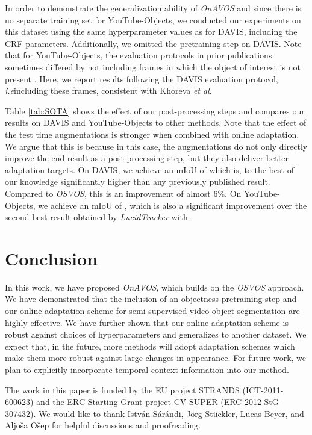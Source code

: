 \documentclass{bmvc2k}
\newcommand{\methodname}[1]{\mbox{\emph{#1}}}
\def\etal{\emph{et al}\bmvaOneDot}
\def\ie{\emph{i.e}\bmvaOneDot}
\newcommand{\PARbegin}[1]{\noindent {\bf #1~}}
\begin{document}
In order to demonstrate the generalization ability of \methodname{OnAVOS} and since there is no separate training set for YouTube-Objects, we conducted our experiments on this dataset using the same hyperparameter values as for DAVIS, including the CRF parameters. Additionally, we omitted the pretraining step on DAVIS. Note that for YouTube-Objects, the evaluation protocols in prior publications sometimes differed by not including frames in which the object of interest is not present \cite{lucidtracker}. Here, we report results following the DAVIS evaluation protocol, \ie including these frames, consistent with Khoreva \etal \cite{lucidtracker}.

Table \ref{tab:SOTA} shows the effect of our post-processing steps and compares our results on DAVIS and YouTube-Objects to other methods. Note that the effect of the test time augmentations is stronger when combined with online adaptation. We argue that this is because in this case, the augmentations do not only directly improve the end result as a post-processing step, but they also deliver better adaptation targets. On DAVIS, we achieve an mIoU of  which is, to the best of our knowledge significantly higher than any previously published result. Compared to \methodname{OSVOS}, this is an improvement of almost 6\%. On YouTube-Objects, we achieve an mIoU of , which is also a significant improvement over the second best result obtained by \methodname{LucidTracker} with .

\section{Conclusion}
In this work, we have proposed \methodname{OnAVOS}, which builds on the \methodname{OSVOS} approach. We have demonstrated that the inclusion of an objectness pretraining step and our online adaptation scheme for semi-supervised video object segmentation are highly effective. We have further shown that our online adaptation scheme is robust against choices of hyperparameters and generalizes to another dataset. We expect that, in the future, more methods will adopt adaptation schemes which make them more robust against large changes in appearance. For future work, we plan to explicitly incorporate temporal context information into our method.

\vspace{0.6cm}
\PARbegin{Acknowledgements.}
The work in this paper is funded by the EU project STRANDS (ICT-2011-600623) and the ERC Starting
Grant project CV-SUPER (ERC-2012-StG-307432). We would like to thank Istv\'{a}n S\'{a}r\'{a}ndi, J\"{o}rg St\"{u}ckler, Lucas Beyer, and Aljo\v{s}a O\v{s}ep for helpful discussions and proofreading.
\end{document}
